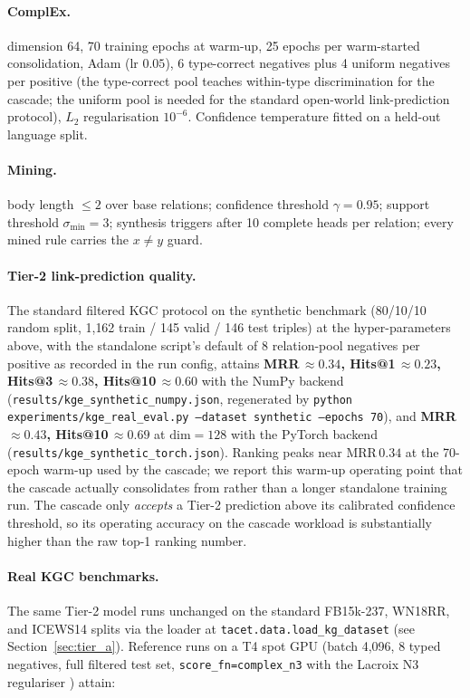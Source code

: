 \documentclass[11pt]{article}
\theoremstyle{plain}
\begin{document}
\paragraph{ComplEx.} dimension 64, 70 training epochs at warm-up, 25 epochs
per warm-started consolidation, Adam (lr $0.05$), 6 type-correct negatives
plus 4 uniform negatives per positive (the type-correct pool teaches
within-type discrimination for the cascade; the uniform pool is needed for
the standard open-world link-prediction protocol), $L_2$ regularisation
$10^{-6}$. Confidence temperature fitted on a held-out language split.

\paragraph{Mining.} body length $\le 2$ over base relations; confidence
threshold $\gamma=0.95$; support threshold $\sigma_{\mathrm{min}}=3$; synthesis triggers
after 10 complete heads per relation; every mined rule carries the
$x\neq y$ guard.

\paragraph{Tier-2 link-prediction quality.} The standard filtered KGC
protocol on the synthetic benchmark (80/10/10 random split, 1{,}162 train /
145 valid / 146 test triples) at the hyper-parameters above, with the
standalone script's default of $8$ relation-pool negatives per positive as
recorded in the run config, attains
\textbf{MRR\,$\approx 0.34$, Hits@1\,$\approx 0.23$, Hits@3\,$\approx 0.38$,
Hits@10\,$\approx 0.60$} with the NumPy backend
(\texttt{results/kge\_synthetic\_numpy.json}, regenerated by
\texttt{python experiments/kge\_real\_eval.py --dataset synthetic --epochs 70}),
and \textbf{MRR\,$\approx 0.43$, Hits@10\,$\approx 0.69$} at $\mathrm{dim}=128$
with the PyTorch backend (\texttt{results/kge\_synthetic\_torch.json}).
Ranking peaks near MRR\,$0.34$ at the 70-epoch warm-up used by the cascade; we
report this warm-up operating point that the cascade actually consolidates from
rather than a longer standalone training run.
The cascade only \emph{accepts} a Tier-2 prediction above its calibrated
confidence threshold, so its operating accuracy on the cascade workload is
substantially higher than the raw top-1 ranking number.

\paragraph{Real KGC benchmarks.}
The same Tier-2 model runs unchanged on the standard FB15k-237,
WN18RR, and ICEWS14 splits via the loader at
\texttt{tacet.data.load\_kg\_dataset} (see
Section~\ref{sec:tier_a}).  Reference runs on a T4 spot GPU
(batch 4{,}096, 8 typed negatives, full filtered test set,
\texttt{score\_fn=complex\_n3} with the Lacroix N3 regulariser
\cite{lacroix2018complex_n3}) attain:
\end{document}
